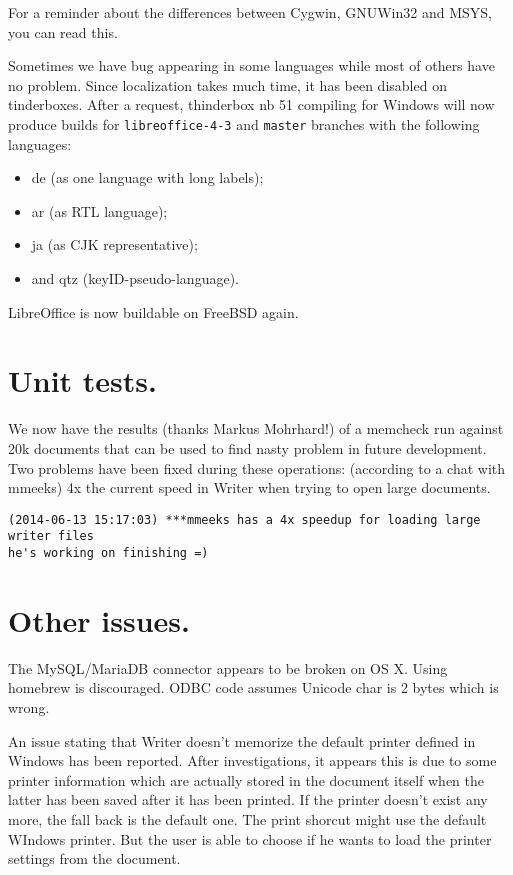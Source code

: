 \documentclass{article}
\begin{document}
For a reminder about the differences between Cygwin, GNUWin32 and MSYS, you can
read this\cite{winBuildCygwinMsysGnuWin32Comparison}.

Sometimes we have bug appearing in some languages while most of others have no
problem. Since localization takes much time, it has been disabled on
tinderboxes. After a request, thinderbox nb 51 compiling for Windows will now
produce builds for \lstinline{libreoffice-4-3} and \lstinline{master} branches
with the following languages:
\begin{itemize}
    \item de (as one language with long labels);
    \item ar (as RTL language);
    \item ja (as CJK representative); 
    \item and qtz (keyID-pseudo-language).  
\end{itemize}

LibreOffice is now buildable on FreeBSD
again\cite{freeBsdBuild1}\cite{freeBsdBuild2}.



\section{Unit tests.}

We now have the results (thanks Markus Mohrhard!) of a memcheck run against 20k
documents that can be used to find nasty problem in future
development\cite{memcheckTests}. Two problems have been fixed during these
operations: (according to a chat with mmeeks) 4x the current speed in Writer
when trying to open large documents.

\begin{lstlisting}
(2014-06-13 15:17:03) ***mmeeks has a 4x speedup for loading large writer files
he's working on finishing =)
\end{lstlisting}



\section{Other issues.}

The MySQL/MariaDB connector appears to be broken on OS X. Using homebrew is
discouraged. ODBC code assumes Unicode char is 2 bytes which is
wrong\cite{sqlConnectorOsx1}\cite{sqlConnectorOsx2}.

An issue stating that Writer doesn't memorize the default printer defined in
Windows has been reported. After investigations, it appears this is due to some
printer information which are actually stored in the document itself when the
latter has been saved after it has been printed. If the printer doesn't exist
any more, the fall back is the default one\cite{writerPrinter1}. The print
shorcut might use the default WIndows printer\cite{writerPrinter2}. But the
user is able to choose if he wants to load the printer settings from the
document\cite{writerPrinter3}.
\end{document}
